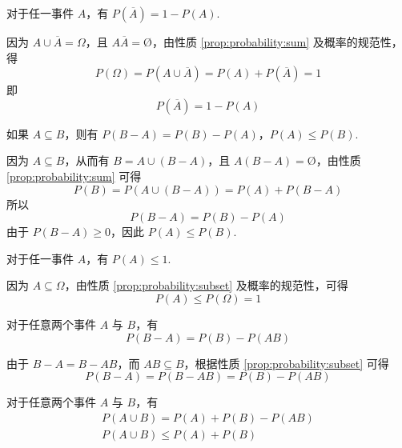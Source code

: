 \begin{property} \label{prop:probability:converse}
    对于任一事件 $A$，有 $P(\overline{A})=1-P(A)$.
\end{property}

\begin{myproof}
    因为 $A \cup \overline{A} = \varOmega$，且 $A \overline{A} = \text{\O}$，由性质 \ref*{prop:probability:sum} 及概率的规范性，得
    $$
    P(\varOmega) = P(A \cup \overline{A}) = P(A) + P(\overline{A}) = 1
    $$
    即
    \[
    P(\overline{A})=1-P(A)
    \]
\end{myproof}

\begin{property} \label{prop:probability:subset}
    如果 $A \subseteq B$，则有 $P(B-A)=P(B)-P(A)$，$P(A) \leqslant P(B)$.
\end{property}

\begin{myproof}
    因为 $A \subseteq B$，从而有 $B = A \cup (B-A)$，且 $A(B-A)=\text{\O}$，由性质 \ref*{prop:probability:sum} 可得
    $$
    P(B) = P(A \cup (B-A)) = P(A) + P(B-A)
    $$
    所以
    $$
    P(B-A)=P(B)-P(A)
    $$
    由于 $P(B-A) \geqslant 0$，因此 $P(A) \leqslant P(B)$.
\end{myproof}

\begin{property} \label{prop:probability:<=1}
    对于任一事件 $A$，有 $P(A) \leqslant 1$.
\end{property}

\begin{myproof}
    因为 $A \subseteq \varOmega$，由性质 \ref*{prop:probability:subset} 及概率的规范性，可得
    \[
    P(A) \leqslant P(\varOmega) = 1
    \]
\end{myproof}

\begin{property}[(概率的减法公式)] \label{prop:probability:subtraction}
    对于任意两个事件 $A$ 与 $B$，有
    \begin{equation}
        P(B-A)=P(B)-P(AB)
    \end{equation}
\end{property}

\begin{myproof}
    由于 $B-A=B-AB$，而 $AB \subseteq B$，根据性质 \ref*{prop:probability:subset} 可得
    \[
    P(B-A)=P(B-AB)=P(B)-P(AB)
    \]
\end{myproof}

\begin{property} \label{prop:probability:add}
    对于任意两个事件 $A$ 与 $B$，有
    \begin{gather} \label{equation:add}
        P(A \cup B) = P(A) + P(B) - P(AB) \\
        P(A \cup B) \leqslant P(A) + P(B) \nonumber
    \end{gather}
\end{property}

